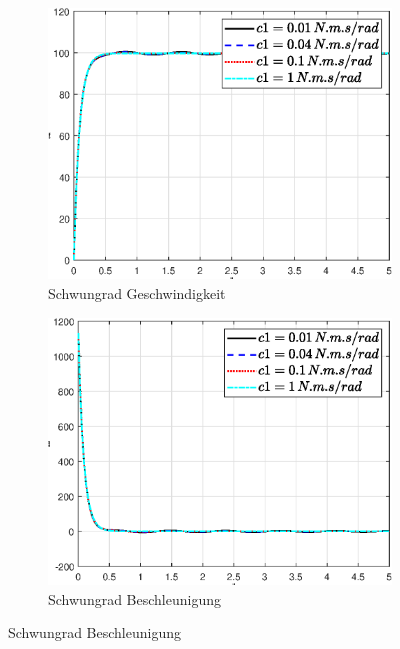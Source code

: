  \begin{figure}
    \captionsetup[subfigure]{justification=centering,font=footnotesize}
    \begin{subfigure}[b]{0.49\linewidth}
        \includegraphics[width=\linewidth]{Bilder/5_sensi/fig/c1/phi_punkt.eps}
        \caption{Schwungrad Geschwindigkeit}
        \label{fig:c1_phi_punkt}
    \end{subfigure}
    \begin{subfigure}[b]{0.49 \linewidth}
        \includegraphics[width=\linewidth]{Bilder/5_sensi/fig/c1/phi_punkt_punkt.eps}
        \caption{Schwungrad Beschleunigung}
        \label{fig:c1_phi_punkt_punkt}

\end{subfigure}
\end{figure}
